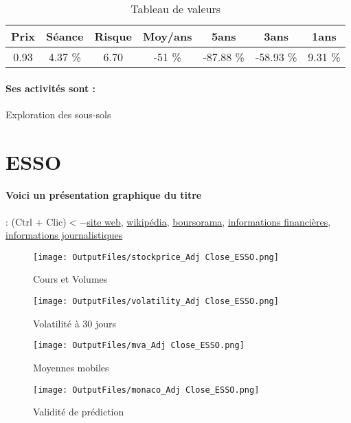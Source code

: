 \documentclass[11pt,a4paper]{report}%
\begin{document}
\begin{table}[H]
  \centering
    \begin{tabular}{|c|c|c|c|c|c|c|}
    \hline
    Prix & Séance & Risque  & Moy/ans & 5ans & 3ans & 1ans \\
    \hline
    0.93 &    4.37 \%    & 6.70 & -51 \% & -87.88 \% & -58.93 \% & 9.31 \% \\
    \hline
    \end{tabular}%
        \label{tab:table_CGG}%
      \caption{Tableau de valeurs}
\end{table}%

\paragraph{Ses activités sont : } Exploration des sous-sols 
    
    \newpage

\section{ESSO}

\paragraph{Voici un présentation graphique du titre} : (Ctrl + Clic)$<-$\href{https://corporate.esso.fr/fr-fr/Actionnaires/Informations-a-intention-des-actionnaires}{site web}, \href{https://fr.wikipedia.org/wiki/Esso_(marque)}{wikipédia}, \href{https://www.boursorama.com/cours/1rPES}{boursorama}, \href{https://www.qwant.com/?q=site:https:%2f%2fwww.easybourse.com%2faction-societe%2fESSO&t=web&client=ext-firefox-hp}{informations financières}, \href{https://bourse.lerevenu.com/cours-de-bourse/fiche-valeur-synthese/ESSO/ES-FR}{informations journalistiques}
\begin{figure}[!htb]
   \begin{minipage}{0.5\textwidth}
     \centering
     \texttt{[image: OutputFiles/stockprice\_Adj Close\_ESSO.png]}
     \caption{Cours et Volumes}\label{Fig:price_ESSO}
   \end{minipage}\hfill
   \begin{minipage}{0.5\textwidth}
     \centering
     \texttt{[image: OutputFiles/volatility\_Adj Close\_ESSO.png]}
     \caption{Volatilité à 30 jours}\label{Fig:volat_ESSO}
   \end{minipage}
\end{figure}
\begin{figure}[!htb]
   \begin{minipage}{0.5\textwidth}
     \centering
     \texttt{[image: OutputFiles/mva\_Adj Close\_ESSO.png]}
     \caption{Moyennes mobiles}\label{Fig:mva_ESSO}
   \end{minipage}\hfill
   \begin{minipage}{0.5\textwidth}
     \centering
     \texttt{[image: OutputFiles/monaco\_Adj Close\_ESSO.png]}
     \caption{Validité de prédiction}\label{Fig:prediction_ESSO}
   \end{minipage}
\end{figure}
\end{document}
